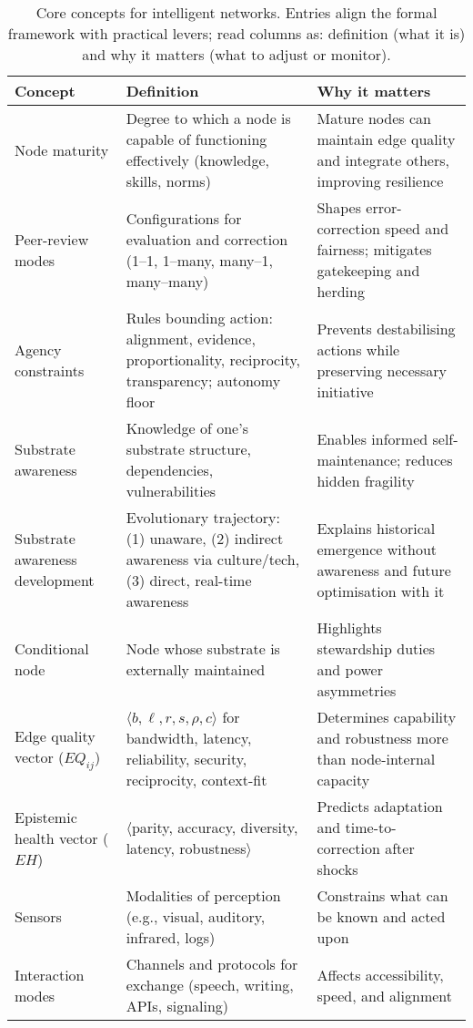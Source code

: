 \documentclass[12pt]{article}
\begin{document}
\begin{table}[htbp]
\centering
\small
\caption{Core concepts for intelligent networks. Entries align the formal framework with practical levers; read columns as: definition (what it is) and why it matters (what to adjust or monitor).}
\label{tab:concepts}
\begin{tabularx}{\linewidth}{lYY}
\toprule
\textbf{Concept} & \textbf{Definition} & \textbf{Why it matters} \\
\midrule
Node maturity & Degree to which a node is capable of functioning effectively (knowledge, skills, norms) & Mature nodes can maintain edge quality and integrate others, improving resilience \\
Peer-review modes & Configurations for evaluation and correction (1--1, 1--many, many--1, many--many) & Shapes error-correction speed and fairness; mitigates gatekeeping and herding \\
Agency constraints & Rules bounding action: alignment, evidence, proportionality, reciprocity, transparency; autonomy floor & Prevents destabilising actions while preserving necessary initiative \\
Substrate awareness & Knowledge of one's substrate structure, dependencies, vulnerabilities & Enables informed self-maintenance; reduces hidden fragility \\
Substrate awareness development & Evolutionary trajectory: (1) unaware, (2) indirect awareness via culture/tech, (3) direct, real-time awareness & Explains historical emergence without awareness and future optimisation with it \\
Conditional node & Node whose substrate is externally maintained & Highlights stewardship duties and power asymmetries \\
Edge quality vector ($EQ_{ij}$) & $\langle b,\ell,r,s,\rho,c\rangle$ for bandwidth, latency, reliability, security, reciprocity, context-fit & Determines capability and robustness more than node-internal capacity \\
Epistemic health vector ($EH$) & $\langle$parity, accuracy, diversity, latency, robustness$\rangle$ & Predicts adaptation and time-to-correction after shocks \\
Sensors & Modalities of perception (e.g., visual, auditory, infrared, logs) & Constrains what can be known and acted upon \\
Interaction modes & Channels and protocols for exchange (speech, writing, APIs, signaling) & Affects accessibility, speed, and alignment \\

\end{tabularx}
\end{table}
\end{document}
